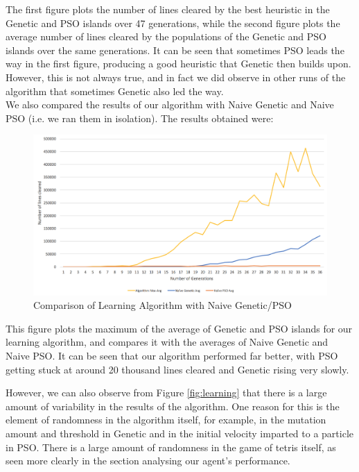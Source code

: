 \documentclass{article}
\begin{document}
	The first figure plots the number of lines cleared by the best heuristic in
	the Genetic and PSO islands over 47 generations, while the second figure plots
	the average number of lines cleared by the populations of the Genetic and PSO
	islands over the same generations. It can be seen that sometimes PSO leads the
	way in the first figure, producing a good heuristic that Genetic then builds
	upon. However, this is not always true, and in fact we did observe in other
	runs of the algorithm that sometimes Genetic also led the way.\\
	We also compared the results of our algorithm with Naive Genetic and Naive PSO
	(i.e. we ran them in isolation). The results obtained were:

	\begin{figure}[h]
		\includegraphics[scale=0.4]{learning/Naive}
		\centering
		\caption{Comparison of Learning Algorithm with Naive Genetic/PSO}
		\label{fig:naive}
	\end{figure}

	This figure plots the maximum of the average of Genetic and PSO islands for
	our learning algorithm, and compares it with the averages of Naive Genetic and
	Naive PSO. It can be seen that our algorithm performed far better, with PSO
	getting stuck at around 20 thousand lines cleared and Genetic rising very slowly.

	However, we can also observe from Figure \ref{fig:learning} that there is a large amount
	of variability in the results of the algorithm. One reason for this is the element
	of randomness in the algorithm itself, for example, in the mutation amount and threshold
	in Genetic and in the initial velocity imparted to a particle in PSO. There is
	a large amount of randomness in the game of tetris itself, as seen more clearly
	in the section analysing our agent's performance.
\end{document}
